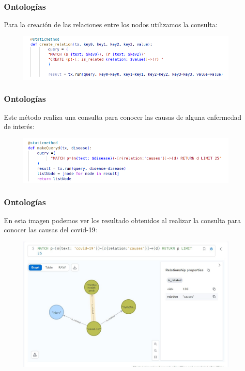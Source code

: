 \documentclass[
11pt, %
%
aspectratio=169, %
]{beamer}
\begin{document}
	\begin{frame}
		\frametitle{Ontolog\'ias}
	
		Para la creación de las relaciones entre los nodos utilizamos la consulta:
		
		\begin{figure}[h!]
			\centering
			\includegraphics[scale=0.5]{../images/imageRelations.png}
		\end{figure} 	
	\end{frame}
	
	\begin{frame}
		\frametitle{Ontolog\'ias}
		
		Este método realiza una consulta para conocer las causas de alguna enfermedad de interés:
		
		\begin{figure}[h!]
			\centering
			\includegraphics[scale=0.5]{../images/imageQuery.png}
		\end{figure} 	
	
	
	\end{frame}

		\begin{frame}
		\frametitle{Ontolog\'ias}
		
		En esta imagen podemos ver los resultado obtenidos al realizar la consulta para conocer las causas del covid-19:
		
		\begin{figure}[h!]
			\centering
			\includegraphics[scale=0.3]{../images/imagecons.png}
		\end{figure} 	
		
		
	\end{frame}
\end{document}
